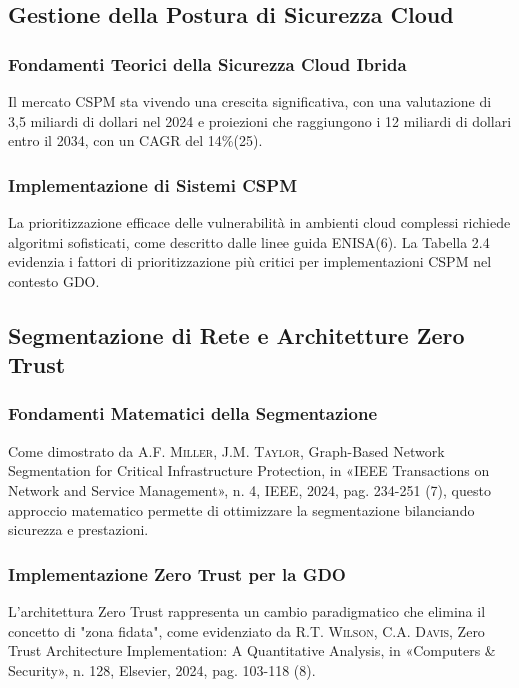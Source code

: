 \documentclass[12pt,a4paper,oneside]{book}
\newcommand{\autore}[1]{\textsc{#1}}
\newcommand{\citarticolo}[7]{%
    \autore{#1}, #2, in «#3», n. #4, #5, #6, pag. #7%
}
\begin{document}
\subsection{Gestione della Postura di Sicurezza Cloud}

\subsubsection{Fondamenti Teorici della Sicurezza Cloud Ibrida}

Il mercato CSPM sta vivendo una crescita significativa, con una valutazione di 3,5 miliardi di dollari nel 2024 e proiezioni che raggiungono i 12 miliardi di dollari entro il 2034, con un CAGR del 14\%(25).

\subsubsection{Implementazione di Sistemi CSPM}

La prioritizzazione efficace delle vulnerabilità in ambienti cloud complessi richiede algoritmi sofisticati, come descritto dalle linee guida ENISA(6). La Tabella 2.4 evidenzia i fattori di prioritizzazione più critici per implementazioni CSPM nel contesto GDO.

\subsection{Segmentazione di Rete e Architetture Zero Trust}

\subsubsection{Fondamenti Matematici della Segmentazione}

Come dimostrato da \citarticolo{A.F. Miller, J.M. Taylor}{Graph-Based Network Segmentation for Critical Infrastructure Protection}{IEEE Transactions on Network and Service Management}{4}{IEEE}{2024}{234-251}(7), questo approccio matematico permette di ottimizzare la segmentazione bilanciando sicurezza e prestazioni.

\subsubsection{Implementazione Zero Trust per la GDO}

L'architettura Zero Trust rappresenta un cambio paradigmatico che elimina il concetto di "zona fidata", come evidenziato da \citarticolo{R.T. Wilson, C.A. Davis}{Zero Trust Architecture Implementation: A Quantitative Analysis}{Computers \& Security}{128}{Elsevier}{2024}{103-118}(8).
\end{document}
